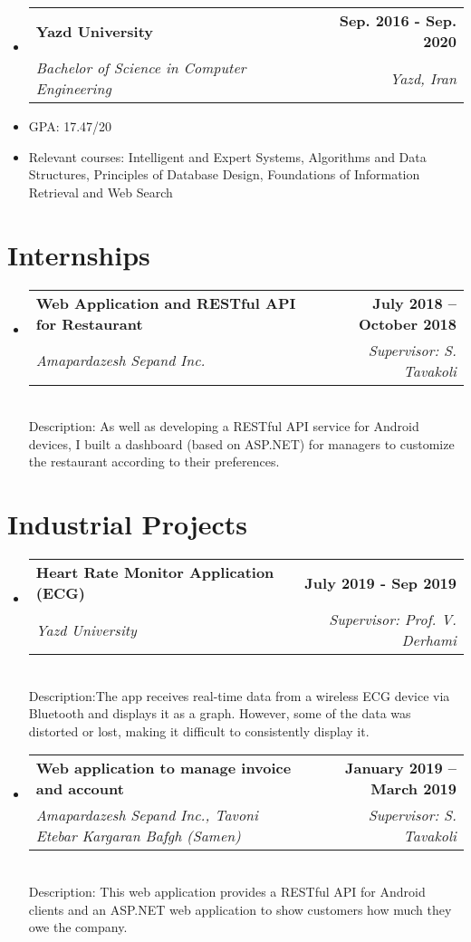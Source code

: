 \documentclass[letterpaper,11pt]{article}
\makeatletter
\newcommand{\resumeSubheading}[4]{
  \vspace{-2pt}\item
    \begin{tabular*}{1.0\textwidth}[t]{l@{\extracolsep{\fill}}r}
      \textbf{#1} & \textbf{\small #2} \\
    \textcolor{sgray} {\textit{\small#3}} & \textcolor{sgray}{ \textit{\small #4} }\\
    \end{tabular*}\vspace{-7pt}
}
\newcommand{\resumeSubheadingD}[5]{
  \vspace{-2pt}\item
    \begin{tabular*}{1.0\textwidth}[t]{l@{\extracolsep{\fill}}r}
      \textbf{#1} & \textbf{\small #2} \\
    \textcolor{sgray} {\textit{\small#3}} & \textcolor{sgray}{ \textit{\small #4} }\\
    \end{tabular*} %
    \\ \vspace{3pt}
    Description:{#5}
}
\newcommand{\resumeSubHeadingListStart}{\begin{itemize}[leftmargin=0.0in, label={}]}
\newcommand{\resumeSubHeadingListEnd}{\end{itemize}}
\makeatother
\begin{document}
  \resumeSubHeadingListStart
    \resumeSubheading
      {Yazd University}{Sep. 2016 - Sep. 2020}
      {Bachelor of Science in Computer Engineering}{Yazd, Iran}
  \resumeSubHeadingListEnd
  
\begin{itemize}[itemsep=-3pt, parsep=5pt]
	\item  GPA: 17.47/20
	
	\item Relevant courses:
	Intelligent and Expert Systems, Algorithms and Data Structures, Principles of Database Design, Foundations of Information Retrieval and Web Search
\end{itemize}  

  
\begin{comment}
\resumeSubHeadingListStart
    \resumeSubheading
      {Malek Sabet High School}{Sep 2012 - June. 2016}
      {Diploma in Physics and Mathematics Discipline}{Yazd, Iran}
  \resumeSubHeadingListEnd
 \small{ GPA: \textbf{19.49}/20, Units: 102, {\href{https://en.wikipedia.org/wiki/Governmental_leading_high_school}{ Affiliation: Governmental leading high school}}
\end{comment}  


\section{Internships}

\resumeSubHeadingListStart
\resumeSubheadingD
{Web Application and RESTful API for Restaurant}{July 2018 – October 2018}
{Amapardazesh Sepand Inc. }{Supervisor: S. Tavakoli}
{
	As well as developing a RESTful API service for Android devices, I built a dashboard  (based on ASP.NET) for managers to customize the restaurant according to their preferences.
}
\resumeSubHeadingListEnd

\section{Industrial Projects}

\resumeSubHeadingListStart
\resumeSubheadingD
{Heart Rate Monitor Application (ECG)}{
	July 2019 - Sep 2019
}
{Yazd University}
{Supervisor: Prof. V. Derhami}
{The app receives real-time data from a wireless ECG device via Bluetooth and displays it as a graph. However, some of the data was distorted or lost, making it difficult to consistently display it. }
\resumeSubHeadingListEnd


\resumeSubHeadingListStart
\resumeSubheadingD
{Web application to manage invoice and account }{January 2019 – March 2019}
{Amapardazesh Sepand Inc., Tavoni Etebar Kargaran Bafgh (Samen)}{Supervisor: S. Tavakoli}
{
	This web application provides a RESTful API for Android clients and an ASP.NET web application to show customers how much they owe the company.}
\resumeSubHeadingListEnd
\end{document}

